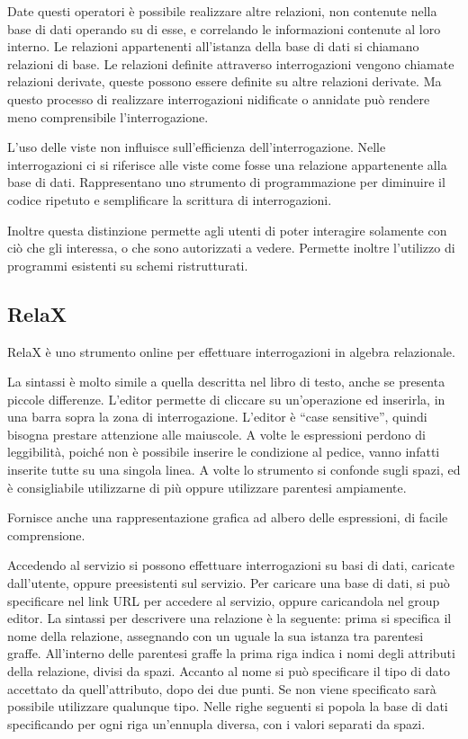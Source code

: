 \documentclass{article}
\numberwithin{equation}{subsection}
\begin{document}
Date questi operatori è possibile realizzare altre relazioni, non contenute nella base di dati operando su di esse, e correlando le informazioni contenute al loro interno. Le relazioni appartenenti all'istanza 
della base di dati si chiamano relazioni di base. Le relazioni definite attraverso interrogazioni vengono chiamate relazioni derivate, queste possono essere definite su altre relazioni derivate. Ma questo processo 
di realizzare interrogazioni nidificate o annidate può rendere meno comprensibile l'interrogazione. 

L'uso delle viste non influisce sull'efficienza dell'interrogazione. Nelle interrogazioni ci si riferisce alle viste come fosse una relazione appartenente alla base di dati. Rappresentano uno strumento di 
programmazione per diminuire il codice ripetuto e semplificare la scrittura di interrogazioni. 

Inoltre questa distinzione permette agli utenti di poter interagire solamente con ciò che gli interessa, o che sono autorizzati a vedere. Permette inoltre l'utilizzo di programmi esistenti su schemi 
ristrutturati. 

\subsection{RelaX}

RelaX è uno strumento online per effettuare interrogazioni in algebra relazionale. 

La sintassi è molto simile a quella descritta nel libro di testo, anche se presenta piccole differenze. L'editor permette di cliccare su un'operazione ed inserirla, in una barra 
sopra la zona di interrogazione. L'editor è ``case sensitive'', quindi bisogna prestare attenzione alle maiuscole. 
A volte le espressioni perdono di leggibilità, poiché non è possibile inserire le condizione al pedice, vanno infatti inserite tutte su una singola linea. A volte lo strumento si confonde sugli spazi, ed è 
consigliabile utilizzarne di più oppure utilizzare parentesi ampiamente. 

Fornisce anche una rappresentazione grafica ad albero delle espressioni, di facile comprensione. 

Accedendo al servizio si possono effettuare interrogazioni su basi di dati, caricate dall'utente, oppure preesistenti sul servizio. Per caricare una base di dati, si può specificare nel link URL per accedere al 
servizio, oppure caricandola nel group editor. 
La sintassi per descrivere una relazione è la seguente: prima si specifica il nome della relazione, assegnando con un uguale la sua istanza tra parentesi graffe. All'interno delle parentesi graffe la prima 
riga indica i nomi degli attributi della relazione, divisi da spazi. Accanto al nome si può specificare il tipo di dato accettato da quell'attributo, dopo dei due punti. Se non viene specificato sarà possibile 
utilizzare qualunque tipo. Nelle righe seguenti si popola la base di dati specificando per ogni riga un'ennupla diversa, con i valori separati da spazi. 
\end{document}
